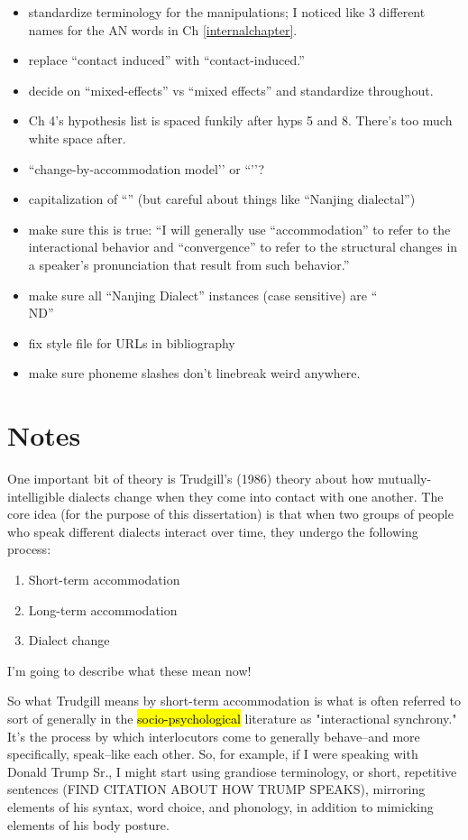 \begin{itemize}
    \item standardize terminology for the manipulations; I noticed like 3 different names for the AN words in Ch \ref{internalchapter}.
    \item replace ``contact induced'' with ``contact-induced.''
    \item decide on ``mixed-effects'' vs ``mixed effects'' and standardize throughout.
    \item Ch 4's hypothesis list is spaced funkily after hyps 5 and 8. There's too much white space after.
    \item ``change-by-accommodation model’’ or ``\cbat{}’’?
    \item capitalization of ``\ND{}'' (but careful about things like ``Nanjing dialectal'')
    \item make sure this is true: ``I will generally use ``accommodation'' to refer to the interactional behavior and ``convergence'' to refer to the structural changes in a speaker's pronunciation that result from such behavior.''
    \item make sure all ``Nanjing Dialect'' instances (case sensitive) are ``\\ND{}''
    \item fix style file for URLs in bibliography
    \item make sure phoneme slashes don't linebreak weird anywhere.
\end{itemize}

\pagebreak

\section{Notes}

    One important bit of theory is Trudgill's (1986) theory about how mutually-intelligible dialects change when they come into contact with one another. The core idea (for the purpose of this dissertation) is that when two groups of people who speak different dialects interact over time, they undergo the following process:
    \begin{enumerate}
        \item Short-term accommodation
        \item Long-term accommodation
        \item Dialect change
    \end{enumerate}
    I'm going to describe what these mean now!

    So what Trudgill means by short-term accommodation is what is often referred to sort of generally in the \hl{socio-psychological} literature as "interactional synchrony." It's the process by which interlocutors come to generally behave--and more specifically, speak--like each other. So, for example, if I were speaking with Donald Trump Sr., I might start using grandiose terminology, or short, repetitive sentences (FIND CITATION ABOUT HOW TRUMP SPEAKS), mirroring elements of his syntax, word choice, and phonology, in addition to mimicking elements of his body posture.


